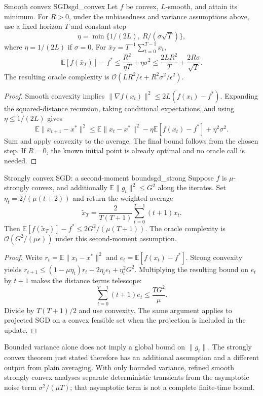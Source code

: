 \documentclass[11pt]{article}
\begin{document}
\begin{theorem}{Smooth convex SGD}{sgd_convex}
Let $f$ be convex, $L$-smooth, and attain its minimum. For $R>0$, under the unbiasedness and variance assumptions above, use a fixed horizon $T$ and constant step
\[
\eta=\min\{1/(2L),\ R/(\sigma\sqrt T)\},
\]
where $\eta=1/(2L)$ if $\sigma=0$. For $\bar x_T=T^{-1}\sum_{t=0}^{T-1}x_t$,
\[
\mathbb E[f(\bar x_T)]-f^*\le \frac{R^2}{\eta T}+\eta\sigma^2
\le \frac{2LR^2}{T}+\frac{2R\sigma}{\sqrt T}.
\]
The resulting oracle complexity is $\mathcal O(LR^2/\epsilon+R^2\sigma^2/\epsilon^2)$.
\end{theorem}
\begin{proof}
Smooth convexity implies $\|\nabla f(x_t)\|^2\le2L(f(x_t)-f^*)$. Expanding the squared-distance recursion, taking conditional expectations, and using $\eta\le1/(2L)$ gives
\[
\mathbb E\|x_{t+1}-x^*\|^2\le\mathbb E\|x_t-x^*\|^2
-\eta\mathbb E[f(x_t)-f^*]+\eta^2\sigma^2.
\]
Sum and apply convexity to the average. The final bound follows from the chosen step. If $R=0$, the known initial point is already optimal and no oracle call is needed.
\end{proof}

\begin{theorem}{Strongly convex SGD: a second-moment bound}{sgd_strong}
Suppose $f$ is $\mu$-strongly convex, and additionally $\mathbb E\|g_t\|^2\le G^2$ along the iterates. Set $\eta_t=2/(\mu(t+2))$ and return the weighted average
\[
\widetilde x_T=\frac{2}{T(T+1)}\sum_{t=0}^{T-1}(t+1)x_t.
\]
Then $\mathbb E[f(\widetilde x_T)]-f^*\le2G^2/(\mu(T+1))$.
The oracle complexity is $\mathcal O(G^2/(\mu\epsilon))$ under this second-moment assumption.
\end{theorem}
\begin{proof}
Write $r_t=\mathbb E\|x_t-x^*\|^2$ and $e_t=\mathbb E[f(x_t)-f^*]$. Strong convexity yields
$r_{t+1}\le(1-\mu\eta_t)r_t-2\eta_t e_t+\eta_t^2G^2$.
Multiplying the resulting bound on $e_t$ by $t+1$ makes the distance terms telescope:
\[
\sum_{t=0}^{T-1}(t+1)e_t\le \frac{TG^2}{\mu}.
\]
Divide by $T(T+1)/2$ and use convexity. The same argument applies to projected SGD on a convex feasible set when the projection is included in the update.
\end{proof}

\begin{remark}
Bounded variance alone does not imply a global bound on $\|g_t\|$. The strongly convex theorem just stated therefore has an additional assumption and a different output from plain averaging. With only bounded variance, refined smooth strongly convex analyses separate deterministic transients from the asymptotic noise term $\sigma^2/(\mu T)$; that asymptotic term is not a complete finite-time bound.
\end{remark}
\end{document}
